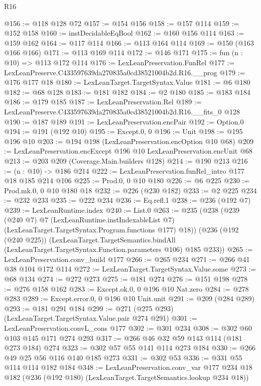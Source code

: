 \begin{lexlean}{R16}
\begin{coremodule}
@156 := @118 @128 @72
@157 := @154 @156
@158 := @157 @114
@159 := @152 @158
@160 := instDecidableEqBool
@162 := @160 @156 @114
@163 := @159 @162
@164 := @117 @114
@166 := @113 @164 @114
@169 := @150 (@163 @166 @166)
@171 := @113 @169 @114
@172 := @146 @171
@175 := fun (n : @10) => @113 @172 @114
@176 := LexLeanPreservation.FunRel
@177 := LexLeanPreserve.C433597639da270835a0cd38521004b2d.R16.__prog
@179 := @176 @177 @18
@180 := LexLeanTarget.TargetSyntax.Value
@181 := @6 @180
@182 := @68 @128
@183 := @181 @182
@184 := @2 @180
@185 := @183 @184
@186 := @179 @185
@187 := LexLeanPreservation.Rel
@189 := LexLeanPreserve.C433597639da270835a0cd38521004b2d.R16.__fits_0 @128
@190 := @187 @189
@191 := LexLeanPreservation.encPair
@192 := Option.{0}
@194 := @191 (@192 @10)
@195 := Except.{0, 0}
@196 := Unit
@198 := @195 @196 @10
@203 := @194 @198 (LexLeanPreservation.encOption @10 @68)
@209 := LexLeanPreservation.encExcept @196 @10 LexLeanPreservation.encUnit @68
@213 := @203 @209 (Coverage.Main.builders @128)
@214 := @190 @213
@216 := (n : @10) -> @186 @214
@222 := LexLeanPreservation.funRel_intro @177 @18 @185 @214 @106
@225 := Prod.{0, 0} @10 @180
@226 := @6 @225
@230 := Prod.mk.{0, 0} @10 @180 @18
@232 := @226 (@230 @182)
@233 := @2 @225
@234 := @232 @233
@235 := @222 @234
@236 := Eq.refl.{1}
@238 := @236 (@192 @7)
@239 := LexLeanRuntime.index
@240 := List.{0}
@263 := @235
    (@238
      (@239
        (@240 @7)
        @7
        (LexLeanRuntime.instIndexableList @7)
        (LexLeanTarget.TargetSyntax.Program.functions @177)
        @18))
    (@236
      (@192 (@240 @225))
      (LexLeanTarget.TargetSemantics.bindAll
        (LexLeanTarget.TargetSyntax.Function.parameters @106)
        @185
        @233))
@265 := LexLeanPreservation.conv_build @177
@266 := @265 @234
@271 := @266 @41 @38 @104 @172 @114
@272 := LexLeanTarget.TargetSyntax.Value.some
@273 := @68 @134
@274 := @272 @273
@275 := @181 @274
@276 := @151 @198
@278 := @276 @158 @162
@283 := Except.ok.{0, 0} @196 @10 Nat.zero
@284 := @278 @283
@289 := Except.error.{0, 0} @196 @10 Unit.unit
@291 := @209 (@284 @289)
@293 := @181 @291 @184
@299 := @271 (@275 @293) (LexLeanTarget.TargetSyntax.Value.pair @274 @291)
@301 := LexLeanPreservation.convL_cons @177
@302 := @301 @234
@308 := @302 @60 @103 @145 @171 @274 @293
@317 := @266 @46 @32 @59 @143 @114 (@181 @273 @184) @274
@323 := @302 @57 @55 @141 @114 @273 @184
@330 := @266 @49 @25 @56 @116 @140 @185 @273
@331 := @302 @53
@336 := @331 @55 @114 @114 @182 @184
@348 := LexLeanPreservation.conv_var
    @177
    @234
    @18
    @182
    (@236 (@192 @180) (LexLeanTarget.TargetSemantics.lookup @234 @18))

\end{coremodule}
\end{lexlean}
